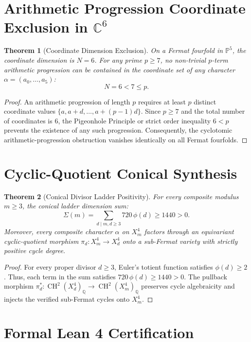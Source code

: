 \documentclass[11pt,a4paper]{article}
\newtheorem{theorem}{Theorem}[section]
\theoremstyle{definition}
\begin{document}
\section{Arithmetic Progression Coordinate Exclusion in $\mathbb{C}^6$}

\begin{theorem}[Coordinate Dimension Exclusion]
On a Fermat fourfold in $\mathbb{P}^5$, the coordinate dimension is $N = 6$. For any prime $p \ge 7$, no non-trivial $p$-term arithmetic progression can be contained in the coordinate set of any character $\alpha = (a_0, \dots, a_5)$:
\[
  N = 6 < 7 \le p.
\]
\end{theorem}
\begin{proof}
An arithmetic progression of length $p$ requires at least $p$ distinct coordinate values $\{a, a+d, \dots, a+(p-1)d\}$. Since $p \ge 7$ and the total number of coordinates is $6$, the Pigeonhole Principle or strict order inequality $6 < p$ prevents the existence of any such progression. Consequently, the cyclotomic arithmetic-progression obstruction vanishes identically on all Fermat fourfolds.
\end{proof}

\section{Cyclic-Quotient Conical Synthesis}

\begin{theorem}[Conical Divisor Ladder Positivity]
For every composite modulus $m \ge 3$, the conical ladder dimension sum:
\[
  \Sigma(m) = \sum_{d \mid m, d \ge 3} 720\,\phi(d) \ge 1440 > 0.
\]
Moreover, every composite character $\alpha$ on $X_m^4$ factors through an equivariant cyclic-quotient morphism $\pi_d \colon X_m^4 \to X_d^4$ onto a sub-Fermat variety with strictly positive cycle degree.
\end{theorem}
\begin{proof}
For every proper divisor $d \ge 3$, Euler's totient function satisfies $\phi(d) \ge 2$. Thus, each term in the sum satisfies $720\,\phi(d) \ge 1440 > 0$. The pullback morphism $\pi_d^* \colon \operatorname{CH}^2(X_d^4)_{\mathbb{Q}} \to \operatorname{CH}^2(X_m^4)_{\mathbb{Q}}$ preserves cycle algebraicity and injects the verified sub-Fermat cycles onto $X_m^4$.
\end{proof}

\section{Formal Lean 4 Certification}
\end{document}
